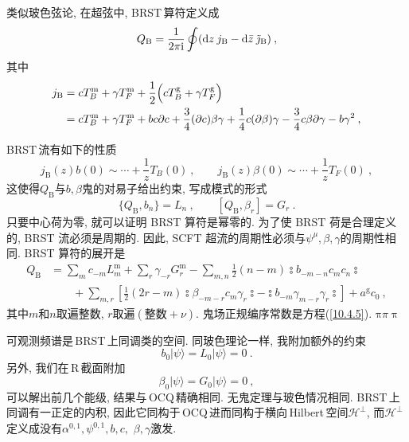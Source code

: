 类似玻色弦论, 在超弦中, BRST\,算符定义成
\begin{equation}
    Q_{\text{B}} = \frac{1}{2\pi\mathrm{i}}\oint (\mathrm{d} z\: j_{\text{B}}-\mathrm{d}\bar{z}\: \tilde{\jmath}_{\text{B}})\:,\label{10.5.20}
\end{equation}
其中
\begin{align}
    j_{\text{B}} &= c T_{B}^{\text{m}} +\gamma T_{F}^{\text{m}} +\frac{1}{2} \Bigl( cT_{B}^{\text{g}}+\gamma T_{F}^{\text{g}}\Bigr) \nonumber \\
    &=  c T_{B}^{\text{m}} +\gamma T_{F}^{\text{m}} + b c\partial c + \frac{3}{4}(\partial c)\beta\gamma
    +\frac{1}{4}c(\partial\beta)\gamma-\frac{3}{4}c\beta \partial\gamma -b\gamma^{2}\:, \label{10.5.21}
\end{align}

BRST\,流有如下的性质
\begin{equation}
    j_{\text{B}}(z)b(0)\sim \cdots + \frac{1}{z}T_{B}(0) \:, \qquad
    j_{\text{B}}(z)\beta(0) \sim \cdots +\frac{1}{z} T_{F}(0) \:, \label{10.5.22}
\end{equation}
这使得$ Q_{\text{B}} $与$ b,\beta $鬼的对易子给出约束, 写成模式的形式
\begin{equation}
    \{Q_{\text{B}},b_{n}\} = L_{n}\:, \qquad [Q_{\text{B}},\beta_{r}]=G_{r}\:. \label{10.5.23}
\end{equation}
只要中心荷为零, 就可以证明 BRST 算符是幂零的. 为了使 BRST 荷是合理定义的, BRST 流必须是周期的. 因此, SCFT 超流的周期性必须与$ \psi^{\mu},\beta,\gamma $的周期性相同. BRST 算符的展开是
\begin{align}
    Q_{\text{B}} &= \sum_{m} c_{-m}L_{m}^{\text{m}} + \sum_{r}\gamma_{-r}G_{r}^{\text{m}} 
    -\sum_{m,n}\frac{1}{2}(n-m) \typecolon \!b_{-m-n} c_{m}c_{n}\typecolon  \nonumber \\
    &\qquad + \sum_{m,r}\left[\frac{1}{2}(2r-m)\typecolon \!\beta_{-m-r}c_{m}\gamma_{r}\!\typecolon
    - \typecolon\! b_{-m}\gamma_{m-r}\gamma_{r}\typecolon \right] + a^{\text{g}} c_{0} \:, \label{10.5.24}
\end{align}
其中$ m $和$ n $取遍整数, $r $取遍$(\text{整数}+\nu)$. 鬼场正规编序常数是方程(\ref{10.4.5}).
$\mathrm{\pi} \pi \uppi$

可观测频谱是\,BRST\,上同调类的空间. 同玻色理论一样, 我附加额外的约束
\begin{equation}
    b_{0}\lvert \psi\rangle = L_{0}\lvert\psi\rangle = 0 \:. \label{10.5.25} 
\end{equation}
另外, 我们在\,R\,截面附加
\begin{equation}
    \beta_{0}\lvert \psi \rangle = G_{0}\lvert \psi \rangle = 0\:, \label{10.5.26}
\end{equation}
可以解出前几个能级, 结果与\,OCQ\,精确相同. 无鬼定理与玻色情况相同. BRST\,上同调有一正定的内积, 因此它同构于\,OCQ\,进而同构于横向\,Hilbert\,空间$ \mathscr{H}^{\bot}$, 而$ \mathscr{H}^{\bot} $定义成没有$ \alpha^{0,1},\psi^{0,1},b,c,$ $\beta,\gamma $激发. 

